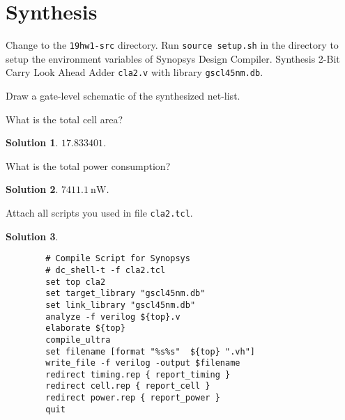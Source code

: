 \documentclass[acmlarge,screen=true,anonymous=false,11pt]{acmart}
\newtheorem*{solution*}{Solution}
\begin{document}
\section{Synthesis}
Change to the \texttt{19hw1-src} directory. Run \texttt{source setup.sh} in the directory to setup the environment variables of Synopsys Design Compiler. Synthesis 2-Bit Carry Look Ahead Adder \texttt{cla2.v} with library \texttt{gscl45nm.db}.
\begin{example}
    Draw a gate-level schematic of the synthesized net-list.
\end{example}
\begin{example}
    What is the total cell area?
\end{example}
\begin{solution*}
    $17.833401$.
\end{solution*}
\begin{example}
    What is the total power consumption?
\end{example}
\begin{solution*}
    $7411.1~\mathrm{nW}$.
\end{solution*}
\begin{example}
    Attach all scripts you used in file \texttt{cla2.tcl}.
\end{example}
\begin{solution*}
    \lstset{language=tcl,
        basicstyle=\ttfamily\scriptsize
    }
    \begin{lstlisting}
        # Compile Script for Synopsys
        # dc_shell-t -f cla2.tcl
        set top cla2
        set target_library "gscl45nm.db"
        set link_library "gscl45nm.db"
        analyze -f verilog ${top}.v
        elaborate ${top}
        compile_ultra
        set filename [format "%s%s"  ${top} ".vh"]
        write_file -f verilog -output $filename
        redirect timing.rep { report_timing }
        redirect cell.rep { report_cell }
        redirect power.rep { report_power }
        quit
    \end{lstlisting}
\end{solution*}
\end{document}
